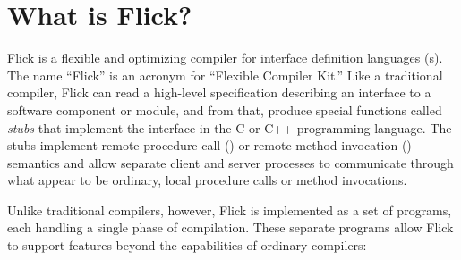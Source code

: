 


\section{What is Flick?}
\label{sec:Intro:What is Flick?}

Flick is a flexible and optimizing compiler for interface definition languages
(\IDL{}s).  The name ``Flick'' is an acronym for ``Flexible \IDL{} Compiler
Kit.''  Like a traditional \IDL{} compiler, Flick can read a high-level
specification describing an interface to a software component or module, and
from that, produce special functions called \emph{stubs} that implement the
interface in the C or C++ programming language.  The stubs implement remote
procedure call (\RPC{}) or remote method invocation (\RMI{}) semantics and
allow separate client and server processes to communicate through what appear
to be ordinary, local procedure calls or method invocations.

Unlike traditional \IDL{} compilers, however, Flick is implemented as a set of
programs, each handling a single phase of compilation.  These separate programs
allow Flick to support features beyond the capabilities of ordinary \IDL{}
compilers:

